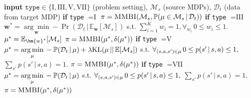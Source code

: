 \begin{algorithm}[H]
\begin{algorithmic}
\State 
{}
\State \hspace{0.5cm}\textbf{input} $\texttt{type} \in \{\textrm{I}, \textrm{III}, \textrm{V}, \textrm{VII} \}$ (problem setting), $\mathcal{M}_s$ (source MDPs), $\mathcal{D}_t$ (data from target MDP)
\State \hspace{0.5cm} \textbf{if} \texttt{type} $= \textrm{I}$
\State \hspace{1.0cm} $\pi = \textsc{MMBI}(\mathcal{M}_s, \mathbb{P}(\mu \in \mathcal{M}_s \, | \, \mathcal{D}_t))$
\State \hspace{0.5cm} \textbf{if} \texttt{type} $= \textrm{III}$
\State \hspace{1.0cm} $\bm{w}^{*} = \underset{\bm{w}}{\arg\min} -\Pr(\mathcal{D}_t \, | \, \mathbb{E}_{\bm{w}}[\mathcal{M}_s])$
\State \hspace{2.0cm} \textrm{s.t.} $\sum_{i=1}^K w_i = 1, \forall_{w_i} \, 0 \leq w_i \leq 1.$
\State \hspace{1.0cm} $\mdp^{*} = \mathbb{E}_{\bm{w}^{*}}[\mathcal{M}_s]$
\State \hspace{1.0cm} $\pi = \textsc{MMBI}(\mu^{*}, \delta(\mu^{*}))$
\State \hspace{0.5cm} \textbf{if} \texttt{type} $= \textrm{V}$
\State \hspace{1.0cm} $\mu^{*} = \underset{\mu}{\arg\min} \, -\mathbb{P}(\mathcal{D}_t \, | \, \mu) + \lambda \textrm{KL}(\mu \, || \, \mathbb{E}[\mathcal{M}_s])$
\State \hspace{2.0cm} \textrm{s.t.} $\forall_{(s, a, s') \in \mu} \, 0 \leq p(s' \, | \, s, a) \leq 1,$
\State \hspace{2.5cm} $\sum_{s'} p(s' \, | \, s, a) = 1.$
\State \hspace{1.0cm} $\pi = \textsc{MMBI}(\mu^{*}, \delta(\mu^{*}))$
\State \hspace{0.5cm} \textbf{if} \texttt{type} $= \textrm{VII}$
\State \hspace{1.0cm} $\mu^{*} = \underset{\mu}{\arg\min} \, -\mathbb{P}(\mathcal{D}_t \, | \, \mu)$
\State \hspace{2.0cm} \textrm{s.t.} $\forall_{(s, a, s') \in \mu} \, 0 \leq p(s' \, | \, s, a) \leq 1,$
\State \hspace{2.5cm} $\sum_{s'} p(s' \, | \, s, a) = 1.$
\State \hspace{1.0cm} $\pi = \textsc{MMBI}(\mu^{*}, \delta(\mu^{*}))$
\end{algorithmic}
\label{alg1}
\end{algorithm}
\fi

